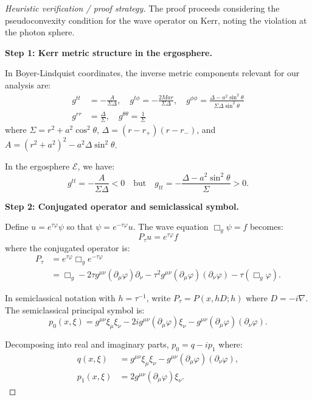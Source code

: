 \documentclass[12pt,a4paper]{article}
\begin{document}
\begin{proof}[Heuristic verification / proof strategy]
The proof proceeds considering the pseudoconvexity condition for the wave operator on Kerr, noting the violation at the photon sphere.

\textbf{Step 1: Kerr metric structure in the ergosphere.}

In Boyer-Lindquist coordinates, the inverse metric components relevant for our analysis are:
\begin{align}
g^{tt} &= -\frac{A}{\Sigma\Delta}, \quad g^{t\phi} = -\frac{2Mar}{\Sigma\Delta}, \quad g^{\phi\phi} = \frac{\Delta - a^2\sin^2\theta}{\Sigma\Delta\sin^2\theta} \\
g^{rr} &= \frac{\Delta}{\Sigma}, \quad g^{\theta\theta} = \frac{1}{\Sigma}
\end{align}
where $\Sigma = r^2 + a^2\cos^2\theta$, $\Delta = (r-r_+)(r-r_-)$, and $A = (r^2+a^2)^2 - a^2\Delta\sin^2\theta$.

In the ergosphere $\mathcal{E}$, we have:
\begin{equation}
g^{tt} = -\frac{A}{\Sigma\Delta} < 0 \quad \text{but} \quad g_{tt} = -\frac{\Delta - a^2\sin^2\theta}{\Sigma} > 0.
\end{equation}

\textbf{Step 2: Conjugated operator and semiclassical symbol.}

Define $u = e^{\tau\varphi}\psi$ so that $\psi = e^{-\tau\varphi}u$. The wave equation $\Box_g\psi = f$ becomes:
\begin{equation}
P_\tau u = e^{\tau\varphi}f
\end{equation}
where the conjugated operator is:
\begin{align}
P_\tau &= e^{\tau\varphi}\Box_g e^{-\tau\varphi} \\
&= \Box_g - 2\tau g^{\mu\nu}(\partial_\mu\varphi)\partial_\nu - \tau^2 g^{\mu\nu}(\partial_\mu\varphi)(\partial_\nu\varphi) - \tau(\Box_g\varphi).
\end{align}

In semiclassical notation with $h = \tau^{-1}$, write $P_\tau = P(x, hD; h)$ where $D = -i\nabla$. The semiclassical principal symbol is:
\begin{equation}
p_0(x, \xi) = g^{\mu\nu}\xi_\mu\xi_\nu - 2i g^{\mu\nu}(\partial_\mu\varphi)\xi_\nu - g^{\mu\nu}(\partial_\mu\varphi)(\partial_\nu\varphi).
\end{equation}

Decomposing into real and imaginary parts, $p_0 = q - ip_1$ where:
\begin{align}
q(x, \xi) &= g^{\mu\nu}\xi_\mu\xi_\nu - g^{\mu\nu}(\partial_\mu\varphi)(\partial_\nu\varphi), \\
p_1(x, \xi) &= 2g^{\mu\nu}(\partial_\mu\varphi)\xi_\nu.
\end{align}


\end{proof}
\end{document}
